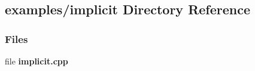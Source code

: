 \subsection{examples/implicit Directory Reference}
\label{dir_388e3be346a7fede5accd7e0cfab96cd}
\subsubsection*{Files}
\begin{DoxyCompactItemize}
\item 
file {\bf implicit.\+cpp}
\end{DoxyCompactItemize}
